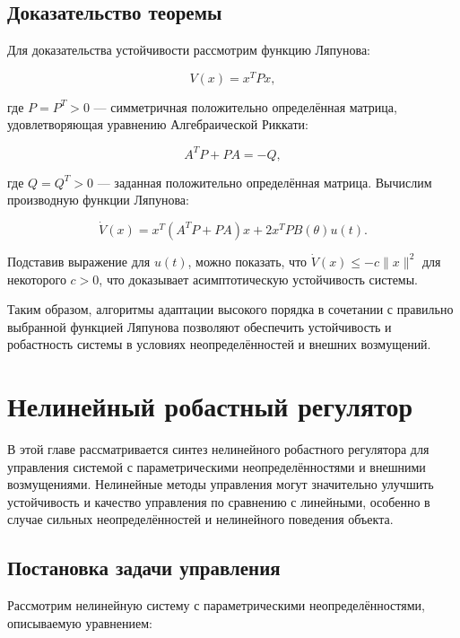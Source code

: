 \documentclass[a4paper,14pt]{extarticle} %
\begin{document}
\subsection*{Доказательство теоремы}

Для доказательства устойчивости рассмотрим функцию Ляпунова:

\begin{equation}
    V(x) = x^T P x,
\end{equation}

где \( P = P^T > 0 \) — симметричная положительно определённая матрица, удовлетворяющая уравнению Алгебраической Риккати:

\begin{equation}
    A^T P + P A = -Q,
\end{equation}

где \( Q = Q^T > 0 \) — заданная положительно определённая матрица. Вычислим производную функции Ляпунова:

\begin{equation}
    \dot{V}(x) = x^T (A^T P + P A) x + 2 x^T P B(\theta)u(t).
\end{equation}

Подставив выражение для \( u(t) \), можно показать, что \( \dot{V}(x) \leq -c \|x\|^2 \) для некоторого \( c > 0 \), что доказывает асимптотическую устойчивость системы.

Таким образом, алгоритмы адаптации высокого порядка в сочетании с правильно выбранной функцией Ляпунова позволяют обеспечить устойчивость и робастность системы в условиях неопределённостей и внешних возмущений.


\newpage
\section{Нелинейный робастный регулятор}

В этой главе рассматривается синтез нелинейного робастного регулятора для управления системой с параметрическими неопределённостями и внешними возмущениями. Нелинейные методы управления могут значительно улучшить устойчивость и качество управления по сравнению с линейными, особенно в случае сильных неопределённостей и нелинейного поведения объекта.

\subsection*{Постановка задачи управления}

Рассмотрим нелинейную систему с параметрическими неопределённостями, описываемую уравнением:
\end{document}
